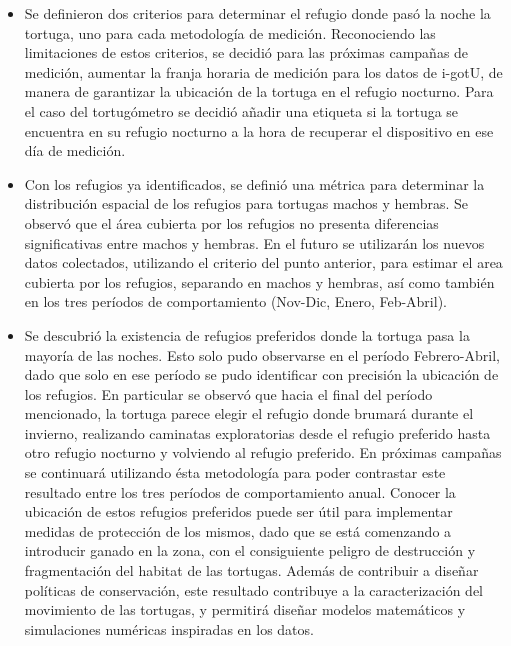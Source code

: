 \begin{itemize}
\item{Se definieron dos criterios para determinar el refugio donde pasó la 
noche la tortuga, uno para cada metodología de medición. Reconociendo las 
limitaciones de estos criterios, se decidió para las próximas campañas de 
medición, aumentar la franja horaria de medición para los datos de i-gotU, 
de manera de garantizar la ubicación de la tortuga en el refugio nocturno. 
Para el caso del tortugómetro se decidió añadir una etiqueta si la tortuga se 
encuentra en su refugio nocturno a la hora de recuperar el dispositivo en ese 
día de medición.}
 
\item{Con los refugios ya identificados, se definió una métrica para 
determinar la distribución espacial de los refugios para tortugas machos y 
hembras. Se observó que el área cubierta por los refugios 
no presenta diferencias significativas entre machos y hembras.
En el futuro se utilizarán los nuevos datos colectados, utilizando el
criterio del punto anterior, para estimar el area cubierta por los refugios, 
separando en machos y hembras, así como también en los tres períodos de
comportamiento (Nov-Dic, Enero, Feb-Abril). 
}
 
\item{Se descubrió la existencia de refugios preferidos donde la tortuga 
pasa la mayoría de las noches. Esto solo pudo observarse en el período 
Febrero-Abril, dado que solo en ese período se pudo identificar con 
precisión la ubicación de los refugios. En particular se observó que 
hacia el final del período mencionado, 
la tortuga 
parece elegir el refugio donde brumará durante el invierno, realizando 
caminatas exploratorias desde el refugio preferido 
hasta otro refugio nocturno y volviendo al refugio preferido. 
En próximas campañas se continuará utilizando ésta metodología para 
poder contrastar este resultado entre los tres períodos de comportamiento 
anual. 
Conocer la ubicación de estos refugios 
preferidos puede ser útil para implementar medidas de 
protección de los mismos, dado que se está comenzando 
a introducir ganado en la zona, con el consiguiente 
peligro de destrucción y fragmentación del habitat de 
las tortugas. Además de contribuir a diseñar políticas
de conservación, este resultado contribuye a la 
caracterización del movimiento de las tortugas, y permitirá
diseñar modelos matemáticos y simulaciones numéricas 
inspiradas en los datos.}
 

\end{itemize}
